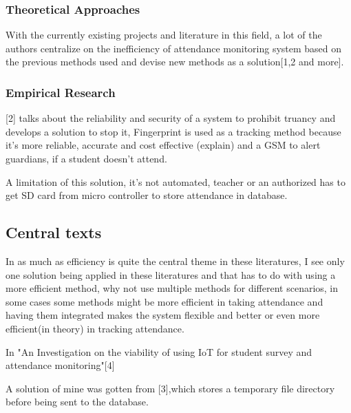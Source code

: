 \subsubsection{Theoretical Approaches}
With the currently existing projects and literature in this field, a lot of the authors centralize on the inefficiency of attendance monitoring system based on the previous methods used and devise new methods as a solution[1,2 and more]. 

\subsubsection{Empirical Research}
[2] talks about the reliability and security of a system to prohibit truancy and develops a solution to stop it, Fingerprint is used as a tracking method because it's more reliable, accurate and cost effective (explain) and a GSM to alert guardians, if a student doesn't attend.

A limitation of this solution, it's not automated, teacher or an authorized has to get SD card from micro controller to store attendance in database.


\subsection{Central texts}

In as much as efficiency is quite the central theme in these literatures, I see only one solution being applied in these literatures and that has to do with using a more efficient method, why not use multiple methods for different scenarios, in some cases some methods might be more efficient in taking attendance and having them integrated makes the system flexible and better or even more efficient(in theory) in tracking attendance.

In "An Investigation on the viability of using IoT for student survey and attendance monitoring"[4]



A solution of mine was gotten from [3],which stores a temporary file directory before being sent to the database.
